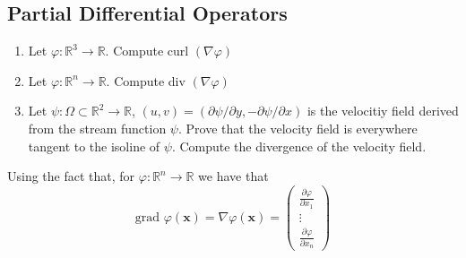 \subsection{Partial Differential Operators}
\label{subsec:Partial Differential Operators}
\begin{enumerate}
    \item Let $ \varphi : \mathbb{R}^3 \to \mathbb{R} $. Compute curl $ \left( \nabla
        \varphi\right)  $
    \item Let $ \varphi : \mathbb{R}^n \to \mathbb{R} $. Compute div $ \left( \nabla
        \varphi  \right)$
    \item Let $ \psi : \Omega \subset \mathbb{R}^2 \to \mathbb{R} $, $ (u,v) = \left(
        \partial \psi / \partial y, - \partial \psi / \partial x\right)  $
    is the velocitiy field derived from the stream function $ \psi $. Prove that the
    velocity field is everywhere tangent to the isoline of $ \psi $. Compute the
    divergence of the velocity field. 
\end{enumerate}
Using the fact that, for $ \varphi : \mathbb{R}^n \to \mathbb{R}  $ we have that 
\[
            \text{grad } \varphi(\boldsymbol{x}) = \nabla \varphi( \boldsymbol{x} ) = \begin{pmatrix*}
                \frac{ \partial \varphi }{ \partial x_1 }  \\
                 \vdots \\
                 \frac{ \partial \varphi }{ \partial x_n } 
            \end{pmatrix*}
\]


